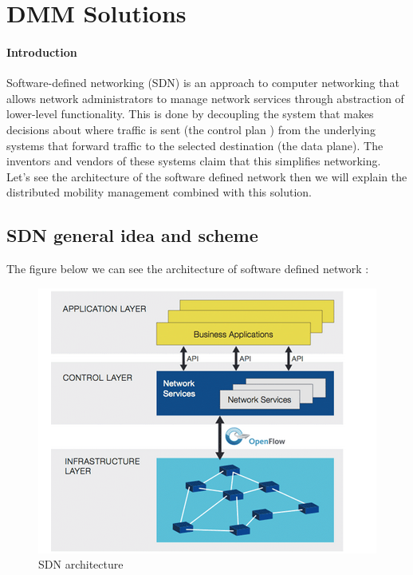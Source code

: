 \documentclass{article}
\begin{document}
\section{DMM Solutions}

\paragraph{Introduction}
Software-defined networking (SDN) is an approach to computer
networking that allows network administrators to manage network
services through abstraction of lower-level functionality. This is
done by decoupling the system that makes decisions about where traffic
is sent (the control plan ) from the underlying systems that forward
traffic to the selected destination (the data plane). The inventors
and vendors of these systems claim that this simplifies networking.\\
\newline
Let's see the architecture of the software defined network then we
will explain the distributed mobility management combined with this
solution.

\subsection{SDN general idea and scheme}


The figure below we can see the architecture of software defined network :

\begin{figure}[h!]
  \centering
    \includegraphics[scale=0.5]{reportPictures/figure5.png}
  \caption{SDN architecture}
\end{figure}
\end{document}
